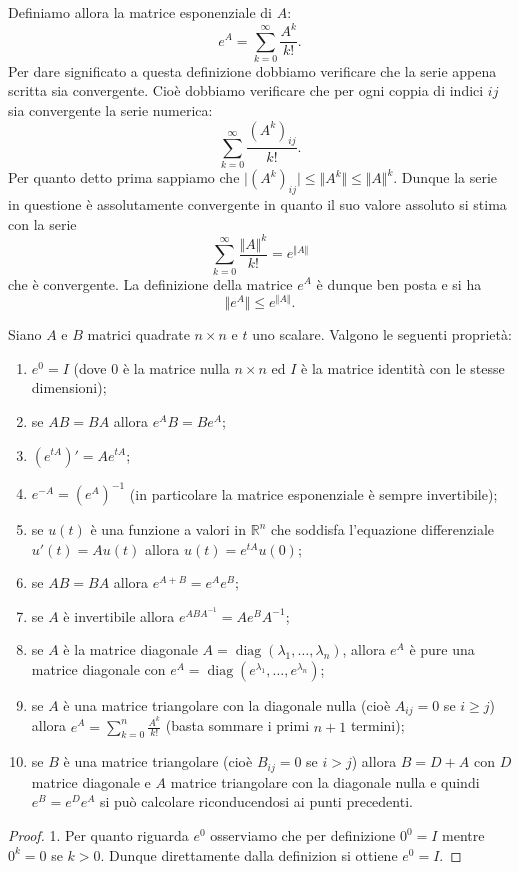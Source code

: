 \documentclass[italian,a4paper]{scrartcl}
\newcommand{\RR}{{\mathbb R}}
\DeclareMathOperator{\diag}{diag}
\begin{document}
Definiamo allora la matrice esponenziale di $A$:
\[
  e^A = \sum_{k=0}^\infty \frac{A^k}{k!}.
\]
Per dare significato a questa definizione dobbiamo verificare che la
serie appena scritta sia convergente. Cioè dobbiamo verificare che per
ogni coppia di indici $ij$ sia convergente la serie numerica:
\[
 \sum_{k=0}^\infty \frac{(A^k)_{ij}}{k!}.
\]
Per quanto detto prima sappiamo che $\lvert(A^k)_{ij}\rvert \le \Vert
A ^k\Vert \le \Vert A \Vert^k$. Dunque la serie in questione è
assolutamente convergente in quanto il suo valore assoluto si stima
con la serie
\[
 \sum_{k=0}^\infty \frac{\Vert A\Vert^k}{k!} = e^{\Vert A\Vert}
\]
che è convergente. La definizione della matrice $e^A$ è dunque
ben posta e si ha
\[
 \Vert e^A\Vert \le e^{\Vert A \Vert}.
\]

\begin{theorem}
Siano $A$ e $B$ matrici quadrate $n\times n$ e $t$ uno scalare.
Valgono le seguenti proprietà:
\begin{enumerate}
\item $e^0 = I$ (dove $0$ è la matrice nulla $n\times n$ ed $I$ è la
  matrice identità con le stesse dimensioni);
\item se $AB=BA$ allora $e^AB = Be^A$;
\item $(e^{tA})' = A e^{tA}$;
\item $e^{-A} = (e^A)^{-1}$ (in particolare la matrice esponenziale è
  sempre invertibile);
\item se $u(t)$ è una funzione a valori in $\RR^n$ che soddisfa
  l'equazione differenziale $u'(t) = Au(t)$ allora $u(t) = e^{tA} u(0)$;
\item se $AB=BA$ allora $e^{A+B} = e^A e^B$;
\item se $A$ è invertibile allora $e^{ABA^{-1}} = Ae^BA^{-1}$;
\item se $A$ è la matrice diagonale $A = \diag(\lambda_1, \dots, \lambda_n)$, allora $e^A$
 è pure una matrice diagonale con $e^A = \diag(e^{\lambda_1},\dots, e^{\lambda_n})$;
\item se $A$ è una matrice triangolare con la diagonale nulla (cioè
  $A_{ij}=0$ se $i\ge j$) allora $e^A = \sum_{k=0}^n \frac{A^k}{k!}$
  (basta sommare i primi $n+1$ termini);
\item se $B$ è una matrice triangolare (cioè $B_{ij}=0$ se $i > j$)
  allora $B = D + A$ con $D$ matrice diagonale e $A$ matrice
  triangolare con la diagonale nulla e quindi $e^B = e^De^A$ si può
  calcolare riconducendosi ai punti precedenti.
\end{enumerate}
\begin{proof}
1. Per quanto riguarda $e^0$ osserviamo che per definizione $0^0=I$
mentre $0^k=0$ se $k>0$. Dunque direttamente dalla definizion si
ottiene $e^0=I$.


\end{proof}
\end{theorem}
\end{document}

